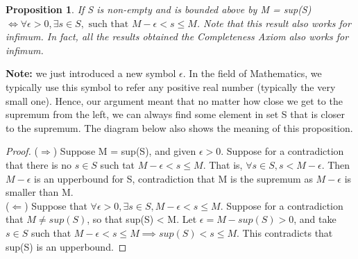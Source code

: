 \documentclass{book}
\newtheorem{proposition}[theorem]{Proposition}
\begin{document}
\begin{proposition}
    If S is non-empty and is bounded above by M = sup(S) $\iff \forall \epsilon > 0, \exists s \in S, \text{ such that } M - \epsilon < s \leq M$. Note that this result also works for infimum. In fact, all the results obtained the Completeness Axiom also works for infimum.
\end{proposition}

\textbf{Note:} we just introduced a new symbol $\epsilon$. In the field of Mathematics, we typically use this symbol to refer any positive real number (typically the very small one). Hence, our argument meant that no matter how close we get to the supremum from the left, we can always find some element in set S that is closer to the supremum. The diagram below also shows the meaning of this proposition.

\begin{center}
\end{center}

\begin{proof}
    ($\Rightarrow$) Suppose M = sup(S), and given $\epsilon > 0$. Suppose for a contradiction that there is no $s \in S$ such tat $M - \epsilon < s \leq M$. That is, $\forall s \in S, s < M - \epsilon$. Then $M - \epsilon$ is an upperbound for S, contradiction that M is the supremum as $M - \epsilon$ is smaller than M. \\
    ($\Leftarrow$) Suppose that $\forall \epsilon > 0, \exists s \in S, M - \epsilon < s \leq M$. Suppose for a contradiction that $M \neq sup(S)$, so that sup(S) < M. Let $\epsilon = M - sup(S) > 0$, and take $s \in S$ such that $M - \epsilon < s \leq M \implies sup(S) < s \leq M$. This contradicts that sup(S) is an upperbound.
\end{proof}
\end{document}
